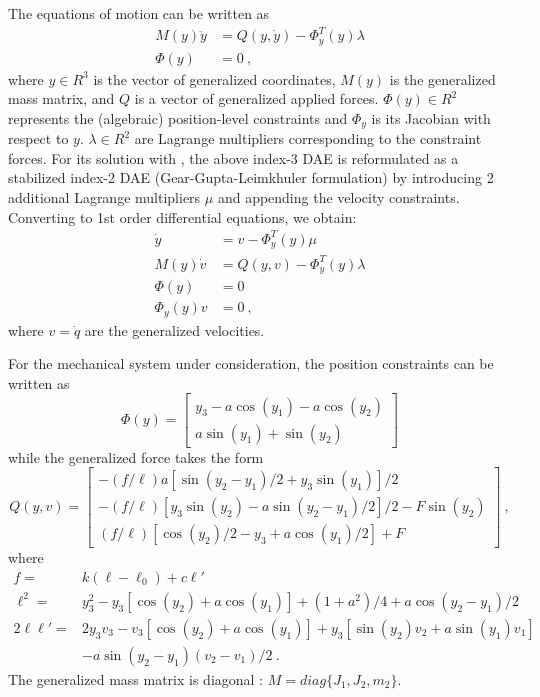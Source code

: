 The equations of motion can be written as
\begin{equation*}
  \begin{split}
    M(y) \ddot y &= Q(y,\dot y) - \Phi_y^T(y) \lambda \\
    \Phi(y)     &= 0 ~,
  \end{split}
\end{equation*}
where $y \in R^3$ is the vector of generalized coordinates, $M(y)$ is the generalized mass
matrix, and $Q$ is a vector of generalized applied forces. $\Phi(y) \in R^2$ represents the
(algebraic) position-level constraints and $\Phi_y$ is its Jacobian with respect to $y$.
$\lambda \in R^2$ are Lagrange multipliers corresponding to the constraint forces.
For its solution with {\idas}, the above index-3 DAE is reformulated as a stabilized 
index-2 DAE (Gear-Gupta-Leimkhuler formulation) by introducing 2 additional Lagrange 
multipliers $\mu$ and appending the velocity constraints.
Converting to 1st order differential equations, we obtain:
\begin{equation}\label{e:GGLform}
\begin{split}
  \dot y &= v - \Phi_y^T(y) \mu  \\
  M(y) \dot v &= Q(y,v) - \Phi_y^T(y) \lambda \\
  \Phi(y)     &= 0 \\
  \Phi_y(y) v &= 0 ~,
\end{split}
\end{equation}
where $v = \dot q$ are the generalized velocities.

For the mechanical system under consideration, the position constraints can be written as
\begin{equation*}
  \Phi(y) = \begin{bmatrix}
    y_3 - a \cos(y_1) - a \cos(y_2) \\
    a \sin(y_1) + \sin(y_2)
  \end{bmatrix}
\end{equation*}
while the generalized force takes the form
\begin{equation*}
  Q(y, v) = \begin{bmatrix}
    - (f/\ell) a [\sin(y_2-y_1)/2 + y_3 \sin(y_1)]/2 \\
    - (f/\ell) [ y_3 \sin(y_2) - a \sin(y_2-y_1)/2]/2 - F \sin(y_2) \\
    (f/\ell) [\cos(y_2)/2 - y_3 + a \cos(y_1)/2 ] + F
  \end{bmatrix} ~,
\end{equation*}
where
\begin{equation*}
  \begin{split}
    f = & k (\ell - \ell_0) + c {\ell}' \\
    \ell^2 = & y_3^2 - y_3 [\cos(y_2) + a \cos(y_1)] + (1 + a^2)/4 + a \cos(y_2-y_1)/2 \\
    2 \ell {\ell}' = & 2 y_3 v_3 - v_3 [\cos(y_2) + a \cos(y_1)] + y_3 [\sin(y_2)v_2 + a\sin(y_1)v_1] \\
    & - a \sin(y_2-y_1) (v_2-v_1)/2 ~.
  \end{split}
\end{equation*}
The generalized mass matrix is diagonal : $M = diag \{J_1, J_2, m_2\}$.


